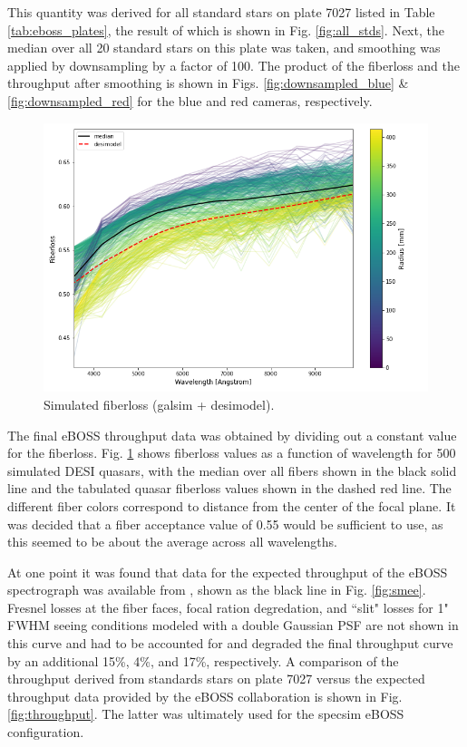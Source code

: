 This quantity was derived for all standard stars on plate 7027 listed in Table \ref{tab:eboss_plates}, the result of which is shown in Fig. \ref{fig:all_stds}. Next, the median over all 20 standard stars on this plate was taken, and smoothing was applied by downsampling by a factor of 100. The product of the fiberloss and the throughput after smoothing is shown in Figs. \ref{fig:downsampled_blue} \& \ref{fig:downsampled_red} for the blue and red cameras, respectively. 


\begin{figure}[h]
\centering
\includegraphics[width=14cm]{images/specsim/desimodel-qso-fiberloss.png}
\caption{Simulated fiberloss (galsim + desimodel).}
\label{fig:desimodel_qso_floss}
\end{figure}


The final eBOSS throughput data was obtained by dividing out a constant value for the fiberloss. Fig. \ref{fig:desimodel_qso_floss} shows fiberloss values as a function of wavelength for 500 simulated DESI quasars, with the median over all fibers shown in the black solid line and the tabulated quasar fiberloss values shown in the dashed red line. The different fiber colors correspond to distance from the center of the focal plane. It was decided that a fiber acceptance value of 0.55 would be sufficient to use, as this seemed to be about the average across all wavelengths.

At one point it was found that data for the expected throughput of the eBOSS spectrograph was available from \cite{Smee_2013}, shown as the black line in Fig. \ref{fig:smee}. Fresnel losses at the fiber faces, focal ration degredation, and ``slit" losses for 1" FWHM seeing conditions modeled with a double Gaussian PSF are not shown in this curve and had to be accounted for and degraded the final throughput curve by an additional 15\%, 4\%, and 17\%, respectively. A comparison of the throughput derived from standards stars on plate 7027 versus the expected throughput data provided by the eBOSS collaboration is shown in Fig. \ref{fig:throughput}. The latter was ultimately used for the specsim eBOSS configuration.


